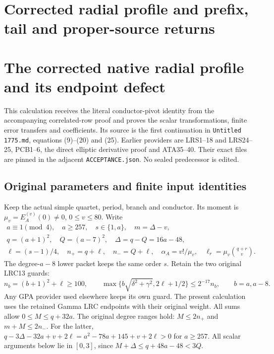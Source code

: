 \endgroup

\clearpage
\begingroup


\setcounter{equation}{0}
\renewcommand{\theequation}{A02CRS.\arabic{equation}}
\section*{Corrected radial profile and prefix, tail and proper-source returns}
\begingroup
\section{The corrected native radial profile and its endpoint defect}
\label{a02crs:sec:CRS}

This calculation receives the literal conductor-pivot identity from the
accompanying correlated-row proof and proves the scalar transformations,
finite error transfers and coefficients. Its source is the first
continuation in \texttt{Untitled 1775.md}, equations (9)--(20) and (25).
Earlier providers are LRS1--18 and LRS24--25, PCB1--6, the direct elliptic
derivative proof and ATA35--40. Their exact files are pinned in the
adjacent \texttt{ACCEPTANCE.json}. No sealed predecessor is edited.

\subsection{Original parameters and finite input identities}

Keep the actual simple quartet, period, branch and conductor. Its moment
is $\mu_v=E_A^{(v)}(0)\ne0$, $0\le v\le80$. Write
\[
\begin{gathered}
 a\equiv1\pmod4,\quad a\ge257,\quad s\in\{1,a\},\quad m=\Delta-v,\\
 q=(a+1)^2,\quad Q=(a-7)^2,\quad \Delta=q-Q=16a-48,\\
 \ell=(s-1)/4,\quad n_+=q+\ell,\quad n_-=Q+\ell,\quad
 \alpha_A=v!/\mu_v,\quad \ell_r=\mu_v\binom{q+r}{v}.
\end{gathered}\tag{CRS1}
\]
The degree-$a-8$ lower packet keeps the same order $s$. Retain the two
original LRC13 guards:
\[
 n_b=(b+1)^2+\ell\ge100,\qquad
 \max\{b\sqrt{\delta^2+\gamma^2},2\ell+1/2\}
 \le2^{-17}n_b,\qquad b=a,a-8.                         \tag{CRS2}
\]
Any GPA provider used elsewhere keeps its own guard. The present
calculation uses the retained Gamma LRC endpoints with their original
weight. All sums allow $0\le M\le q+32a$.
The original degree ranges hold: $M\le2n_+$ and $m+M\le2n_-$.
For the latter,
$q-3\Delta-32a+v+2\ell=a^2-78a+145+v+2\ell>0$ for $a\ge257$.
All scalar arguments below lie in $[0,3]$, since
$M+\Delta\le q+48a-48<3Q$.

